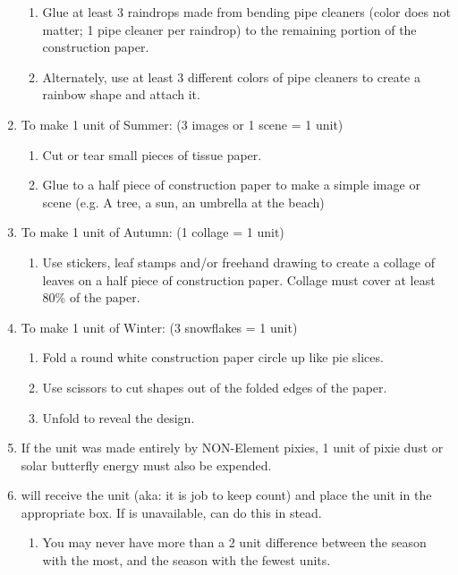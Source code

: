 \documentclass[green]{PP}
\begin{document}
\begin{enumerate}
\begin{enumerate}
		\item Glue at least 3 raindrops made from bending pipe cleaners (color does not matter; 1 pipe cleaner per raindrop) to the remaining portion of the construction paper.
		\item Alternately, use at least 3 different colors of pipe cleaners to create a rainbow shape and attach it.
	\end{enumerate}
	\item To make 1 unit of Summer: (3 images or 1 scene = 1 unit)
	\begin{enumerate}
		\item Cut or tear small pieces of tissue paper.
		\item Glue to a half piece of construction paper to make a simple image or scene (e.g. A tree, a sun, an umbrella at the beach)
	\end{enumerate}
	\item To make 1 unit of Autumn: (1 collage = 1 unit)
	\begin{enumerate}
		\item Use stickers, leaf stamps and/or freehand drawing to create a collage of leaves on a half piece of construction paper. Collage must cover at least 80\% of the paper.
	\end{enumerate}
	\item To make 1 unit of Winter: (3 snowflakes = 1 unit)
	\begin{enumerate}
		\item Fold a round white construction paper circle up like pie slices.
		\item Use scissors to cut shapes out of the folded edges of the paper.
		\item Unfold to reveal the design.
	\end{enumerate}
	\item If the unit was made entirely by NON-Element pixies, 1 unit of pixie dust or solar butterfly energy must also be expended.
	\item \cEHead{} will receive the unit (aka: it is \cEHead{\their} job to keep count) and place the unit in the appropriate box. If \cEHead{} is unavailable, \cSHead{} can do this in \cEHead{\their} stead.
	\begin{enumerate}
		\item You may never have more than a 2 unit difference between the season with the most, and the season with the fewest units.
	\end{enumerate}
\end{enumerate}
\end{document}
